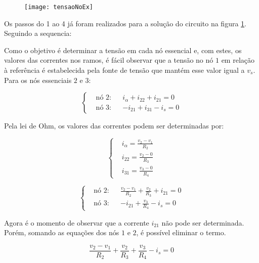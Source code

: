 \documentclass[12pt,fleqn]{book} %
\begin{document}
\begin{example}[Aplicação]
\begin{figure}[!htbp] \centering\texttt{[image: tensaoNoEx]}
            \caption{}\label{tensaoNoEx} 
        \end{figure}
        
Os passos do 1 ao 4 já foram realizados para a solução do circuito na figura \ref{tensaoNoEx}. Seguindo a sequencia:

Como o objetivo é determinar a tensão em cada nó essencial e, com estes, os valores das correntes nos ramos, é fácil observar que a tensão no nó $1$ em relação à referência é estabelecida pela fonte de tensão que mantém esse valor igual a $v_s$. Para os nós essenciais $2$ e $3$:

\begin{equation}\label{sistemaNo}
    \left\{\begin{aligned} & 
         \text{nó 2:} && i_\alpha + i_{22} + i_{21}=0\\& 
        \text{nó 3:} && -i_{21}+i_{31}-i_s=0
    \end{aligned}\right.
    \end{equation} 
    
    Pela lei de Ohm, os valores das correntes podem ser determinadas por:
    
    \begin{equation}\label{sistemaNo}
    \left\{\begin{aligned} & 
          i_\alpha = \frac{v_2-v_1}{R_2}\\& 
         i_{22}=\frac{v_2 - 0}{R_3}\\&
         i_{31} = \frac{v_3-0}{R_4}
    \end{aligned}\right.
    \end{equation} 
    
    \begin{equation}\label{sistemaNo}
    \left\{\begin{aligned} & 
         \text{nó 2:} && \frac{v_2-v_1}{R_2} + \frac{v_2}{R_3} + i_{21}=0\\& 
        \text{nó 3:} && -i_{21}+ \frac{v_3}{R_4}-i_s=0
    \end{aligned}\right.
    \end{equation}
    
    Agora é o momento de observar que a corrente $i_{21}$ não pode ser determinada. Porém, somando as equações dos nós $1$ e $2$, é possível eliminar o termo.
    
    \begin{equation}\label{superNo}
    \frac{v_2-v_1}{R_2} + \frac{v_2}{R_3}+\frac{v_3}{R_4}-i_s = 0
    \end{equation}
    

\end{example}
\end{document}
